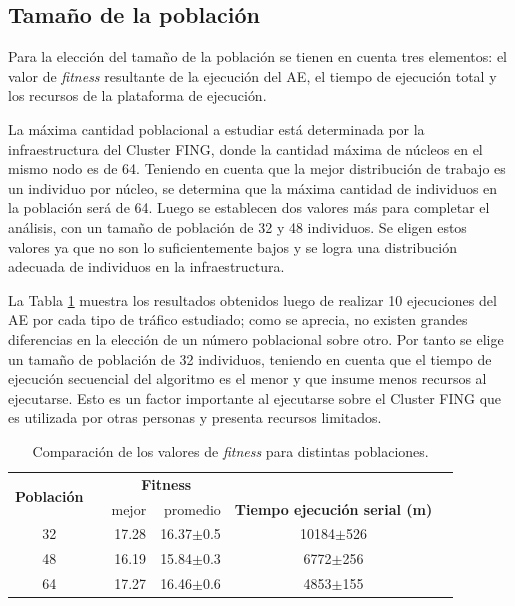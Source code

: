 \subsection{Tamaño de la población}

Para la elección del tamaño de la población se tienen en cuenta tres elementos: el valor de \emph{fitness} resultante de la ejecución del AE, el tiempo de ejecución total y los recursos de la plataforma de ejecución.

La máxima cantidad poblacional a estudiar está determinada por la infraestructura del Cluster FING, donde la cantidad máxima de núcleos en el mismo nodo es de 64. Teniendo en cuenta que la mejor distribución de trabajo es un individuo por núcleo, se determina que la máxima cantidad de individuos en la población será de 64. Luego se establecen dos valores más para completar el análisis, con un tamaño de población de 32 y 48 individuos. Se eligen estos valores ya que no son lo suficientemente bajos y se logra una distribución adecuada de individuos en la infraestructura.

La Tabla \ref{table:parametro_poblacion} muestra los resultados obtenidos luego de realizar 10 ejecuciones del AE por cada tipo de tráfico estudiado; como se aprecia, no existen grandes diferencias en la elección de un número poblacional sobre otro. Por tanto se elige un tamaño de población de 32 individuos, teniendo en cuenta que el tiempo de ejecución secuencial del algoritmo es el menor y que insume menos recursos al ejecutarse. Esto es un factor importante al ejecutarse sobre el Cluster FING que es utilizada por otras personas y presenta recursos limitados.

\begin{table}[h]
	\renewcommand{\arraystretch}{1.2}
	\caption{Comparación de los valores de \emph{fitness} para distintas poblaciones.}
	\label{table:parametro_poblacion}
	\centering
	\begin{tabular}{ccrrcp{2cm}}
		\hline
	    \multirow{2}{*}{\textbf{Población}}& & 
		\multicolumn{2}{c}{\textbf{Fitness}} \\
		\cline{3-4}
		& & {mejor} 
		& {promedio} 
		& \textbf{Tiempo ejecución serial (m)} \\
		\hline
		32 & & {17.28} & 16.37$\pm$0.5 & 10184$\pm$526\\
		48 & & {16.19} & 15.84$\pm$0.3 & 6772$\pm$256\\
		64 & & {17.27} & 16.46$\pm$0.6 & 4853$\pm$155\\
		\hline
	\end{tabular}
\end{table}

